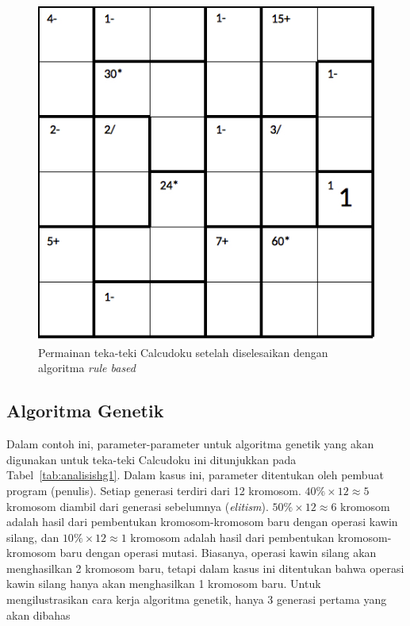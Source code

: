 \begin{figure}
\centering
\captionsetup{justification=centering}
\includegraphics[scale=0.333]{Gambar/hybridgenetic/PuzzleAfterRuleBased}
\caption[Permainan teka-teki Calcudoku setelah diselesaikan dengan algoritma \textit{rule based}]{Permainan teka-teki Calcudoku setelah diselesaikan dengan algoritma \textit{rule based}}
\label{fig:analisishg2}
\end{figure}

\subsection{Algoritma Genetik}
\label{sec:analisisgenetik}

Dalam contoh ini, parameter-parameter untuk algoritma genetik yang akan digunakan untuk teka-teki Calcudoku ini ditunjukkan pada Tabel~\ref{tab:analisishg1}. Dalam kasus ini, parameter ditentukan oleh pembuat program (penulis). Setiap generasi terdiri dari 12 kromosom. \begin{math}40\% \times 12 \approx 5\end{math} kromosom diambil dari generasi sebelumnya (\textit{elitism}). \begin{math}50\% \times 12 \approx 6\end{math} kromosom adalah hasil dari pembentukan kromosom-kromosom baru dengan operasi kawin silang, dan \begin{math}10\% \times 12 \approx 1\end{math} kromosom adalah hasil dari pembentukan kromosom-kromosom baru dengan operasi mutasi. Biasanya, operasi kawin silang akan menghasilkan 2 kromosom baru, tetapi dalam kasus ini ditentukan bahwa operasi kawin silang hanya akan menghasilkan 1 kromosom baru. Untuk mengilustrasikan cara kerja algoritma genetik, hanya 3 generasi pertama yang akan dibahas


